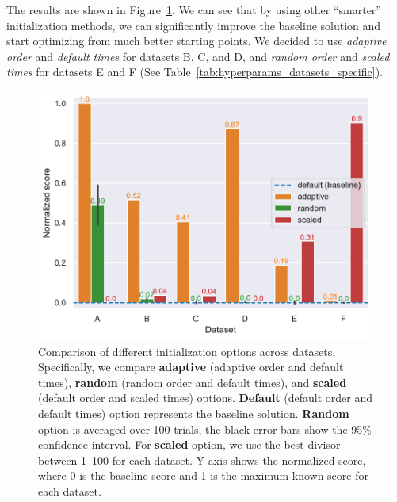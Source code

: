 The results are shown in Figure~\ref{fig:init_comparison}. We can see that by using other ``smarter'' initialization methods, we can significantly improve the baseline solution and start optimizing from much better starting points.
We decided to use \textit{adaptive order} and \textit{default times} for datasets B, C, and D, and \textit{random order} and \textit{scaled times} for datasets E and F (See Table~\ref{tab:hyperparams_datasets_specific}).

\begin{figure}[h]
    \centering
    \includegraphics[width=\linewidth]{img/experiments/init_experiment.pdf}
    \caption[Comparison of initialization options]{
        Comparison of different initialization options across datasets.
        Specifically, we compare \textcolor{myorange}{\textbf{adaptive}} (adaptive order and default times), \textcolor{mygreen}{\textbf{random}} (random order and default times), and \textcolor{myred}{\textbf{scaled}} (default order and scaled times) options. \textcolor{myblue}{\textbf{Default}} (default order and default times) option represents the baseline solution.
        \textcolor{mygreen}{\textbf{Random}} option is averaged over 100 trials, the black error bars show the 95\% confidence interval.
        For \textcolor{myred}{\textbf{scaled}} option, we use the best divisor between 1--100 for each dataset.
        Y-axis shows the normalized score, where 0 is the baseline score and 1 is the maximum known score for each dataset.
    }
    \label{fig:init_comparison}
\end{figure}

